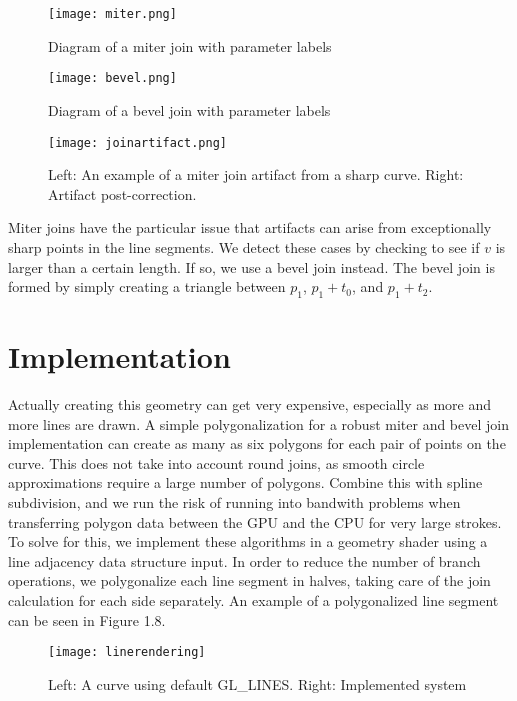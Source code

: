 \begin{figure}
	\begin{center}
		\texttt{[image: miter.png]}
		\caption{Diagram of a miter join with parameter labels}
	\end{center}
\end{figure}

\begin{figure}
	\begin{center}
		\texttt{[image: bevel.png]}
		\caption{Diagram of a bevel join with parameter labels}
	\end{center}
\end{figure}

\begin{figure}
\texttt{[image: joinartifact.png]}
\caption{Left: An example of a miter join artifact from a sharp curve. Right: Artifact post-correction.}
\end{figure}

Miter joins have the particular issue that artifacts can arise from exceptionally sharp points in the line segments.
We detect these cases by checking to see if $v$ is larger than a certain length.
If so, we use a bevel join instead.
The bevel join is formed by simply creating a triangle between $p_1$, $p_1 + t_0$, and $p_1 + t_2$.

\pagebreak
\section{Implementation}

Actually creating this geometry can get very expensive, especially as more and more lines are drawn. 
A simple polygonalization for a robust miter and bevel join implementation can create as many as six polygons for each pair of points on the curve.
This does not take into account round joins, as smooth circle approximations require a large number of polygons.
Combine this with spline subdivision, and we run the risk of running into bandwith problems when transferring polygon data between the GPU and the CPU for very large strokes.
To solve for this, we implement these algorithms in a geometry shader using a line adjacency data structure input.
In order to reduce the number of branch operations, we polygonalize each line segment in halves, taking care of the join calculation for each side separately.
An example of a polygonalized line segment can be seen in Figure 1.8.

\begin{figure}
\texttt{[image: linerendering]}
\caption{Left: A curve using default GL\_LINES. Right: Implemented system}
\end{figure}

